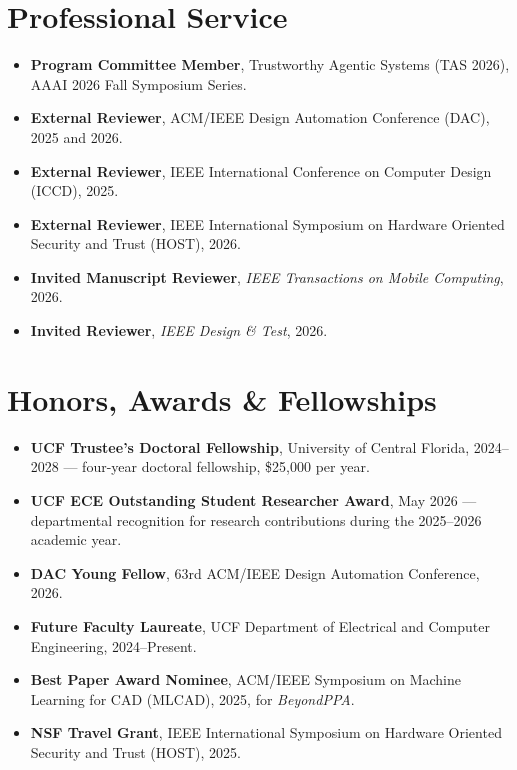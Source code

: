 \documentclass[11pt,letterpaper]{article}
\begin{document}
\section*{Professional Service}
\begin{itemize}
  \item \textbf{Program Committee Member}, Trustworthy Agentic Systems (TAS 2026), AAAI 2026 Fall
  Symposium Series.
  \item \textbf{External Reviewer}, ACM/IEEE Design Automation Conference (DAC), 2025 and 2026.
  \item \textbf{External Reviewer}, IEEE International Conference on Computer Design (ICCD), 2025.
  \item \textbf{External Reviewer}, IEEE International Symposium on Hardware Oriented Security and
  Trust (HOST), 2026.
  \item \textbf{Invited Manuscript Reviewer}, \textit{IEEE Transactions on Mobile Computing}, 2026.
  \item \textbf{Invited Reviewer}, \textit{IEEE Design \& Test}, 2026.
\end{itemize}

\section*{Honors, Awards \& Fellowships}
\begin{itemize}
  \item \textbf{UCF Trustee's Doctoral Fellowship}, University of Central Florida, 2024--2028 ---
  four-year doctoral fellowship, \$25,000 per year.
  \item \textbf{UCF ECE Outstanding Student Researcher Award}, May 2026 --- departmental recognition
  for research contributions during the 2025--2026 academic year.
  \item \textbf{DAC Young Fellow}, 63rd ACM/IEEE Design Automation Conference, 2026.
  \item \textbf{Future Faculty Laureate}, UCF Department of Electrical and Computer Engineering,
  2024--Present.
  \item \textbf{Best Paper Award Nominee}, ACM/IEEE Symposium on Machine Learning for CAD (MLCAD),
  2025, for \textit{BeyondPPA}.
  \item \textbf{NSF Travel Grant}, IEEE International Symposium on Hardware Oriented Security and
  Trust (HOST), 2025.
\end{itemize}
\end{document}
